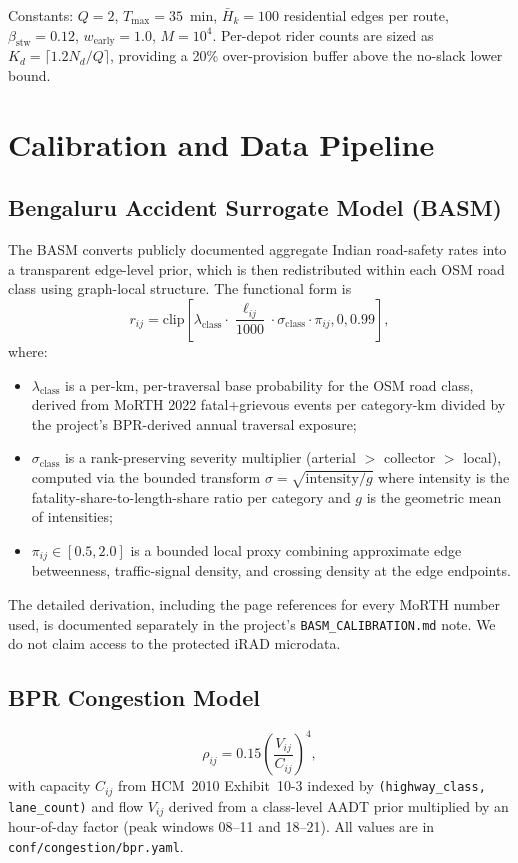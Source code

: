 \documentclass{ieeeaccess}
\begin{document}
Constants: $Q = 2$, $T_{\max} = 35$~min,
$\bar{H}_k = 100$ residential edges per route,
$\beta_{\text{stw}} = 0.12$, $w_{\text{early}} = 1.0$, $M = 10^4$.
Per-depot rider counts are sized as
$K_d = \lceil 1.2 N_d / Q \rceil$, providing a 20\% over-provision
buffer above the no-slack lower bound.

\section{Calibration and Data Pipeline}
\label{sec:calibration}

\subsection{Bengaluru Accident Surrogate Model (BASM)}
\label{subsec:basm}

The BASM converts publicly documented aggregate Indian road-safety
rates into a transparent edge-level prior, which is then redistributed
within each OSM road class using graph-local structure. The functional
form is
\begin{equation}
r_{ij} = \mathrm{clip}\!\left[
\lambda_{\text{class}} \cdot \frac{\ell_{ij}}{1000} \cdot
\sigma_{\text{class}} \cdot \pi_{ij},
0, 0.99 \right],
\label{eq:BASM}
\end{equation}
where:
\begin{itemize}
\item $\lambda_{\text{class}}$ is a per-km, per-traversal base
probability for the OSM road class, derived from MoRTH 2022 fatal+grievous
events per category-km divided by the project's BPR-derived annual
traversal exposure;
\item $\sigma_{\text{class}}$ is a rank-preserving severity multiplier
(arterial $>$ collector $>$ local), computed via the bounded transform
$\sigma = \sqrt{\text{intensity} / g}$ where intensity is the
fatality-share-to-length-share ratio per category and $g$ is the
geometric mean of intensities;
\item $\pi_{ij} \in [0.5, 2.0]$ is a bounded local proxy combining
approximate edge betweenness, traffic-signal density, and crossing
density at the edge endpoints.
\end{itemize}
The detailed derivation, including the page references for every
MoRTH number used, is documented separately in the project's
\texttt{BASM\_CALIBRATION.md} note. We do not claim access to the
protected iRAD microdata.

\subsection{BPR Congestion Model}
\begin{equation}
\rho_{ij} = 0.15 \left(\frac{V_{ij}}{C_{ij}}\right)^4,
\label{eq:BPR}
\end{equation}
with capacity $C_{ij}$ from HCM~2010 \cite{hcm2010} Exhibit~10-3
indexed by \texttt{(highway\_class, lane\_count)} and flow $V_{ij}$
derived from a
class-level AADT prior multiplied by an hour-of-day factor (peak
windows 08--11 and 18--21). All values are in
\texttt{conf/congestion/bpr.yaml}.
\end{document}
